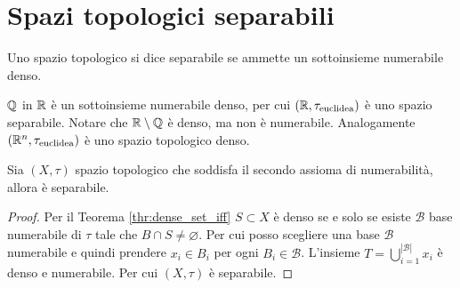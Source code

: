 \section{Spazi topologici separabili}

\begin{definition}
	Uno spazio topologico si dice separabile se ammette un sottoinsieme numerabile denso.
\end{definition}

\begin{example}
	$\mathbb{Q}$ in $\mathbb{R}$ è un sottoinsieme numerabile denso, per cui $(\mathbb{R}, \tau_{\text{euclidea}})$ è uno spazio separabile. Notare che $\mathbb{R} \setminus \mathbb{Q}$ è denso, ma non è numerabile. Analogamente $(\mathbb{R}^n, \tau_{\text{euclidea}})$ è uno spazio topologico denso.
\end{example}

\begin{theorem}
	Sia $(X, \tau)$ spazio topologico che soddisfa il secondo assioma di numerabilità, allora è separabile.	
\end{theorem}
\begin{proof}
	Per il Teorema \ref{thr:dense_set_iff} $S \subset X$ è denso se e solo se esiste $\mathcal{B}$ base numerabile di $\tau$ tale che $B \cap S \neq \varnothing$. Per cui posso scegliere una base $\mathcal{B}$ numerabile e quindi prendere $x_i \in B_i$ per ogni $B_i \in \mathcal{B}$. L'insieme $T = \bigcup^{|\mathcal{B}|}_{i=1} x_i$ è denso e numerabile. Per cui $(X, \tau)$ è separabile.
\end{proof}

